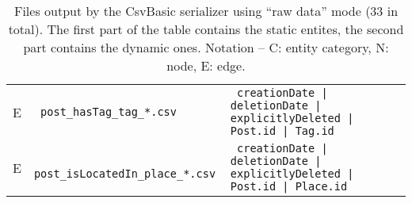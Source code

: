 \begin{table}[htb]
\begin{tabularx}{\linewidth}{|>{\sffamily}c|>{\tt}l|>{\tt}X|}
        E                    & post\_hasTag\_tag\_*.csv                & creationDate | deletionDate | explicitlyDeleted | Post.id | Tag.id                                                                   \\
        E                    & post\_isLocatedIn\_place\_*.csv         & creationDate | deletionDate | explicitlyDeleted | Post.id | Place.id                                                                 \\
        \hline
    \end{tabularx}
    \caption{Files output by the CsvBasic serializer using ``raw data'' mode (33 in total). The first part of the table contains the static entites, the second part contains the dynamic ones.
        Notation -- \textsf{C}: entity category, \textsf{N}: node, \textsf{E}: edge.}
    \label{table:csv_basic_rawdata}
\end{table}
